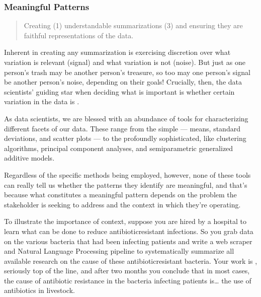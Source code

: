 \documentclass[letterpaper,10pt,english]{jupyterBook}
\begin{document}
\subsubsection{Meaningful Patterns}
\label{\detokenize{30_questions/15_answering_exploratory_questions:meaningful-patterns}}\begin{quote}

\sphinxAtStartPar
Creating (1) understandable summarizations  (3) and ensuring they are faithful representations of the data.
\end{quote}

\sphinxAtStartPar
Inherent in creating any summarization is exercising discretion over what variation is relevant (signal) and what variation is not (noise). But just as one person’s trash may be another person’s treasure, so too may one person’s signal be another person’s noise, depending on their goals! Crucially, then, the data scientists’ guiding star when deciding what is important is whether certain variation in the data is .

\sphinxAtStartPar
As data scientists, we are blessed with an abundance of tools for characterizing different facets of our data. These range from the simple — means, standard deviations, and scatter plots — to the profoundly sophisticated, like clustering algorithms, principal component analyses, and semi\sphinxhyphen{}parametric generalized additive models.

\sphinxAtStartPar
Regardless of the specific methods being employed, however, none of these tools can really tell us whether the patterns they identify are meaningful, and that’s because what constitutes a meaningful pattern depends on the problem the stakeholder is seeking to address and the context in which they’re operating.

\sphinxAtStartPar
To illustrate the importance of context, suppose you are hired by a hospital to learn what can be done to reduce antibiotic\sphinxhyphen{}resistant infections. So you grab data on the various bacteria that had been infecting patients and write a web scraper and Natural Language Processing pipeline to systematically summarize all available research on the cause of these antibiotic\sphinxhyphen{}resistant bacteria. Your work is , seriously top of the line, and after two months you conclude that in most cases, the cause of antibiotic resistance in the bacteria infecting patients is… the use of antibiotics in livestock.
\end{document}
